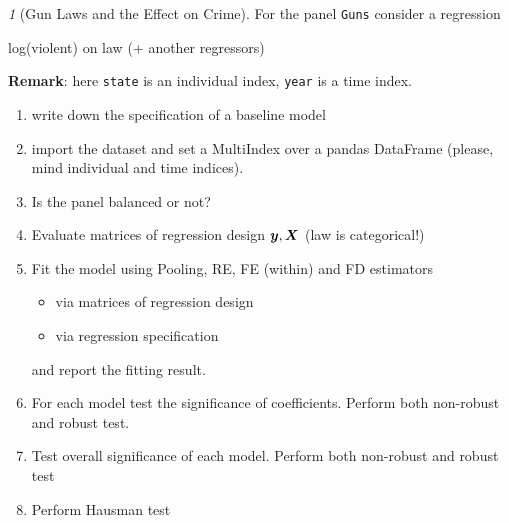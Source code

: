 \documentclass[12pt]{article}
\theoremstyle{remark}
\newtheorem{exercise}{}[section]
\begin{document}
\begin{exercise}[Gun Laws and the Effect on Crime]
For the panel \texttt{Guns} consider a regression
\begin{center}
	log(violent) on law (+ another regressors) 
\end{center}
\textbf{Remark}: here \texttt{state} is an individual index, 
\texttt{year} is a time index.
\begin{enumerate}
	\item write down the specification of a baseline model
	\item import the dataset and set a MultiIndex over a pandas DataFrame 
	(please, mind  individual and time indices).
	\item Is the panel balanced or not?
	\item Evaluate matrices of regression design \({\bm y}, {\bm X}\) (law is categorical!)
	\item Fit the model using Pooling, RE, FE (within) and FD estimators
	\begin{itemize}
		\item via matrices of regression design
		\item via regression specification
	\end{itemize}
	and report the fitting result.
	\item For each model test the significance of coefficients. Perform both
	non-robust and robust test.
	\item Test overall significance of each model. Perform both
	non-robust and robust test
	\item Perform Hausman test
\end{enumerate}
\end{exercise}
\end{document}

